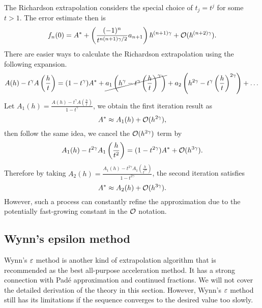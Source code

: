 The Richardson extrapolation considers the special choice of $t_j = t^j$ for some $t > 1$. The error estimate then is 
\begin{equation}
    f_n(0) = A^{\ast} + \left(\frac{(-1)^n}{t^{n(n+1)\gamma/2}} a_{n+1}\right) \hbar^{(n+1)\gamma} + \mathcal O(\hbar^{(n+2)\gamma}).
\end{equation}
There are easier ways to calculate the Richardson extrapolation using the following expansion.
\begin{equation}
    A(h) - t^{\gamma} A\left(\frac{h}{t}\right) = (1 - t^{\gamma}) A^{\ast} + \cancel{a_1 \left(h^{\gamma} - t^{\gamma} \left(\frac{h}{t}\right)^{\gamma}\right)} + a_2\left(h^{2\gamma} - t^{\gamma}\left(\frac{h}{t}\right)^{2\gamma}\right) +\dots
\end{equation}
Let $A_1(h) = \frac{A(h) - t^{\gamma} A(\frac{h}{t}) }{1 - t^{\gamma}} $, we obtain the first iteration result as 
\begin{equation}
    A^{\ast} \approx A_1(h) + \mathcal O(h^{2\gamma}),
\end{equation}
then follow the same idea, we cancel the $\mathcal O(h^{2\gamma})$ term by
\begin{equation}
    A_1(h) - t^{2\gamma} A_1\left(\frac{h}{t^2}\right) = (1 - t^{2\gamma}) A^{\ast} + \mathcal O(h^{3\gamma}).
\end{equation}
Therefore by taking $A_2(h) = \frac{A_1(h)- t^{2\gamma} A_1(\frac{h}{t^{2\gamma}})}{1 - t^{2\gamma}}$, the second iteration satisfies 
\begin{equation}
    A^{\ast}\approx A_2(h) + \mathcal O(h^{3\gamma}).
\end{equation}
However, such a process can constantly refine the approximation due to the potentially fast-growing constant in the $\mathcal O$ notation.

\subsection{Wynn's epsilon method}
\label{SSec: 3-Wynn-Eps-Met}
Wynn's $\varepsilon$ method is another kind of extrapolation algorithm that is recommended as the best all-purpose acceleration method. It has a strong connection with Pad\'e approximation and continued fractions. We will not cover the detailed derivation of the theory in this section. However, Wynn's $\varepsilon$ method still has its limitations if the sequence converges to the desired value too slowly. 

